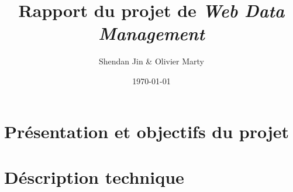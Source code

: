 \documentclass[a4paper, 12pt]{article}
\title{Rapport du projet de \emph{Web Data Management}}
\author{Shendan Jin \& Olivier Marty}
\date\today
\begin{document}
\maketitle

\section{Présentation et objectifs du projet}

\section{Déscription technique}
\end{document}
